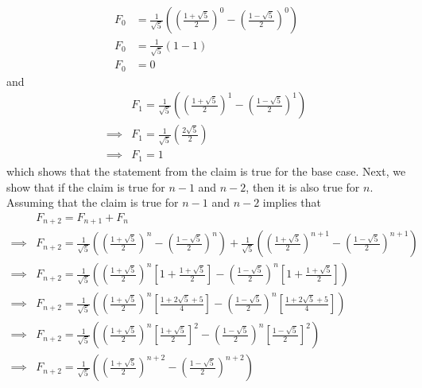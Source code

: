 \documentclass{article}
\begin{document}
\begin{equation*}\begin{aligned}
	F_0 &= \frac{1}{\sqrt{5}}\left (\left ( \frac{1 + \sqrt{5}}{2} \right )^0 - \left (\frac{1 - \sqrt{5}}{2} \right )^0 \right ) \\
	F_0 &= \frac{1}{\sqrt{5}} (1 - 1 ) \\
	F_0 &= 0
\end{aligned}\end{equation*}
and
\begin{equation*}\begin{aligned}
	         & F_1 = \frac{1}{\sqrt{5}} \left (\left ( \frac{1 + \sqrt{5}}{2} \right )^1 - \left (\frac{1 - \sqrt{5}}{2} \right )^1 \right ) \\
	\implies & F_1 = \frac{1}{\sqrt{5}} \left (\frac{2\sqrt{5}}{2}\right ) \\
	\implies & F_1 = 1
\end{aligned}\end{equation*}
which shows that the statement from the claim is true for the base case. Next, we show that if the claim is true for $n-1$ and $n-2$, then it is also true for $n$. Assuming that the claim is true for $n - 1$ and $n - 2$ implies that
\begin{equation*}\begin{aligned}
		 & F_{n+2} = F_{n+1} + F_{n} \\
\implies & F_{n+2} = \frac{1}{\sqrt{5}} \left (\left ( \frac{1 + \sqrt{5}}{2} \right )^{n} - \left (\frac{1 - \sqrt{5}}{2} \right )^{n} \right ) + \frac{1}{\sqrt{5}} \left (\left ( \frac{1 + \sqrt{5}}{2} \right )^{n+1} - \left (\frac{1 - \sqrt{5}}{2} \right )^{n+1} \right ) \\
\implies & F_{n+2} = \frac{1}{\sqrt{5}} \left (\left ( \frac{1 + \sqrt{5}}{2} \right )^{n}\left [1 + \frac{1 + \sqrt{5}}{2} \right ] - \left (\frac{1 - \sqrt{5}}{2} \right )^{n}\left [ 1 + \frac{1 + \sqrt{5}}{2} \right ]  \right ) \\
\implies & F_{n+2} = \frac{1}{\sqrt{5}} \left (\left ( \frac{1 + \sqrt{5}}{2} \right )^{n}\left [\frac{1 + 2\sqrt{5} + 5}{4} \right ] - \left (\frac{1 - \sqrt{5}}{2} \right )^{n}\left [\frac{1 + 2\sqrt{5} + 5}{4} \right ]  \right ) \\
\implies & F_{n+2} = \frac{1}{\sqrt{5}} \left (\left ( \frac{1 + \sqrt{5}}{2} \right )^{n}\left [\frac{1 + \sqrt{5}}{2} \right ]^2 - \left (\frac{1 - \sqrt{5}}{2} \right )^{n}\left [\frac{1 - \sqrt{5}}{2} \right ]^2  \right ) \\
\implies & F_{n+2} = \frac{1}{\sqrt{5}} \left (\left ( \frac{1 + \sqrt{5}}{2} \right )^{n+2} - \left (\frac{1 - \sqrt{5}}{2} \right )^{n+2} \right )
\end{aligned}\end{equation*}
\end{document}
